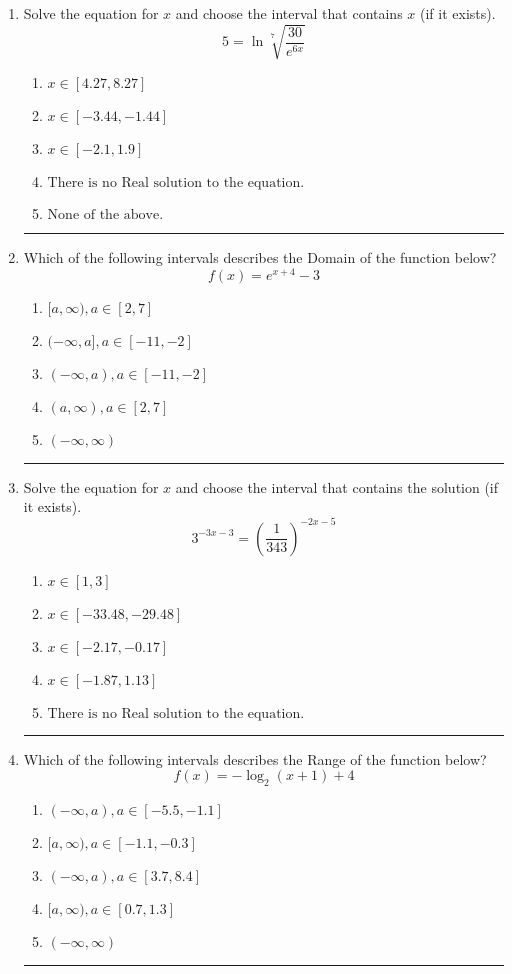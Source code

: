 \documentclass[14pt]{extbook}
\newcommand{\litem}[1]{\item#1\hspace*{-1cm}\rule{\textwidth}{0.4pt}}
\begin{document}
\begin{enumerate}
{\begin{enumerate}[label=\Alph*.]
\end{enumerate} }
\litem{
 Solve the equation for $x$ and choose the interval that contains $x$ (if it exists).\[  5 = \ln{\sqrt[7]{\frac{30}{e^{6x}}}} \]\begin{enumerate}[label=\Alph*.]
\item \( x \in [4.27, 8.27] \)
\item \( x \in [-3.44, -1.44] \)
\item \( x \in [-2.1, 1.9] \)
\item \( \text{There is no Real solution to the equation.} \)
\item \( \text{None of the above.} \)

\end{enumerate} }
\litem{
Which of the following intervals describes the Domain of the function below?\[ f(x) = e^{x+4}-3 \]\begin{enumerate}[label=\Alph*.]
\item \( [a, \infty), a \in [2, 7] \)
\item \( (-\infty, a], a \in [-11, -2] \)
\item \( (-\infty, a), a \in [-11, -2] \)
\item \( (a, \infty), a \in [2, 7] \)
\item \( (-\infty, \infty) \)

\end{enumerate} }
\litem{
Solve the equation for $x$ and choose the interval that contains the solution (if it exists).\[ 3^{-3x-3} = \left(\frac{1}{343}\right)^{-2x-5} \]\begin{enumerate}[label=\Alph*.]
\item \( x \in [1, 3] \)
\item \( x \in [-33.48, -29.48] \)
\item \( x \in [-2.17, -0.17] \)
\item \( x \in [-1.87, 1.13] \)
\item \( \text{There is no Real solution to the equation.} \)

\end{enumerate} }
\litem{
Which of the following intervals describes the Range of the function below?\[ f(x) = -\log_2{(x+1)}+4 \]\begin{enumerate}[label=\Alph*.]
\item \( (-\infty, a), a \in [-5.5, -1.1] \)
\item \( [a, \infty), a \in [-1.1, -0.3] \)
\item \( (-\infty, a), a \in [3.7, 8.4] \)
\item \( [a, \infty), a \in [0.7, 1.3] \)
\item \( (-\infty, \infty) \)


\end{enumerate}}
\end{enumerate}
\end{document}
